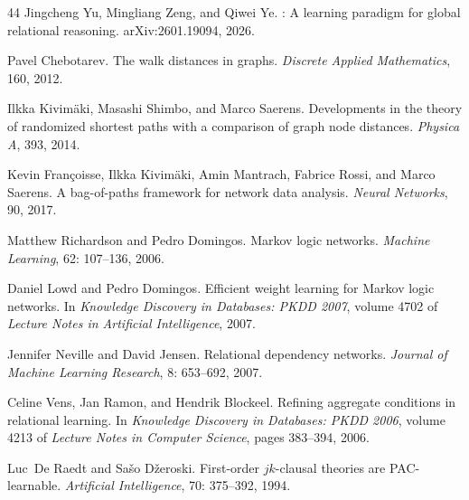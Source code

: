 \documentclass[10pt]{article}
\begin{document}
\begin{thebibliography}{44}
Jingcheng Yu, Mingliang Zeng, and Qiwei Ye.
: A learning paradigm for global relational reasoning.
\newblock arXiv:2601.19094, 2026.

Pavel Chebotarev.
\newblock The walk distances in graphs.
\newblock \emph{Discrete Applied Mathematics}, 160, 2012.

Ilkka Kivim{\"a}ki, Masashi Shimbo, and Marco Saerens.
\newblock Developments in the theory of randomized shortest paths with a
  comparison of graph node distances.
\newblock \emph{Physica A}, 393, 2014.

Kevin Fran{\c{c}}oisse, Ilkka Kivim{\"a}ki, Amin Mantrach, Fabrice Rossi, and
  Marco Saerens.
\newblock A bag-of-paths framework for network data analysis.
\newblock \emph{Neural Networks}, 90, 2017.

Matthew Richardson and Pedro Domingos.
\newblock Markov logic networks.
\newblock \emph{Machine Learning}, 62: 107--136, 2006.

Daniel Lowd and Pedro Domingos.
\newblock Efficient weight learning for {M}arkov logic networks.
\newblock In \emph{Knowledge Discovery in Databases: PKDD 2007}, volume 4702 of
  \emph{Lecture Notes in Artificial Intelligence}, 2007.

Jennifer Neville and David Jensen.
\newblock Relational dependency networks.
\newblock \emph{Journal of Machine Learning Research}, 8: 653--692,
  2007.

Celine Vens, Jan Ramon, and Hendrik Blockeel.
\newblock Refining aggregate conditions in relational learning.
\newblock In \emph{Knowledge Discovery in Databases: PKDD 2006}, volume 4213 of
  \emph{Lecture Notes in Computer Science}, pages 383--394, 2006.

Luc~De Raedt and Sa{\v{s}}o D{\v{z}}eroski.
\newblock First-order $jk$-clausal theories are {PAC}-learnable.
\newblock \emph{Artificial Intelligence}, 70: 375--392, 1994.


\end{thebibliography}
\end{document}
